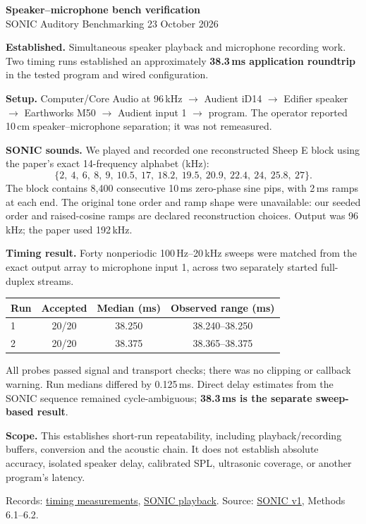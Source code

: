 \documentclass[11pt,letterpaper]{article}
\begin{document}
{\Large\bfseries Speaker--microphone bench verification}\\[-1pt]
{\small SONIC Auditory Benchmarking \hfill 23 October 2026}

\textbf{Established.} Simultaneous speaker playback and microphone recording work.
Two timing runs established an approximately \textbf{38.3\,ms application roundtrip}
in the tested program and wired configuration.

\textbf{Setup.} Computer/Core Audio at 96\,kHz $\to$ Audient iD14 $\to$
Edifier speaker $\to$ Earthworks M50 $\to$ Audient input 1 $\to$ program.
The operator reported 10\,cm speaker--microphone separation; it was not remeasured.

\textbf{SONIC sounds.} We played and recorded one reconstructed Sheep E block using
the paper's exact 14-frequency alphabet (kHz):
\[
\{2,\ 4,\ 6,\ 8,\ 9,\ 10.5,\ 17,\ 18.2,\ 19.5,\ 20.9,\ 22.4,\ 24,\ 25.8,\ 27\}.
\]
The block contains 8,400 consecutive 10\,ms zero-phase sine pips, with 2\,ms
ramps at each end. The original tone order and ramp shape were unavailable:
our seeded order and raised-cosine ramps are declared reconstruction choices.
Output was 96\,kHz; the paper used 192\,kHz.

\textbf{Timing result.} Forty nonperiodic 100\,Hz--20\,kHz sweeps were matched
from the exact output array to microphone input 1, across two separately started
full-duplex streams.
\begin{center}
\begin{tabular}{lccc}
\toprule
Run & Accepted & Median (ms) & Observed range (ms)\\
\midrule
1 & 20/20 & 38.250 & 38.240--38.250\\
2 & 20/20 & 38.375 & 38.365--38.375\\
\bottomrule
\end{tabular}
\end{center}
All probes passed signal and transport checks; there was no clipping or callback
warning. Run medians differed by 0.125\,ms.
Direct delay estimates from the SONIC sequence remained cycle-ambiguous;
\textbf{38.3\,ms is the separate sweep-based result}.

\textbf{Scope.} This establishes short-run repeatability, including playback/recording
buffers, conversion and the acoustic chain. It does not establish absolute accuracy,
isolated speaker delay, calibrated SPL, ultrasonic coverage, or another program's latency.

{\footnotesize
Records:
\href{https://github.com/HowardWHSrun/audiotory_benchmark/blob/main/docs/verification/2026-10-23_Audient_Playback_Microphone_Delay.json}{timing measurements},
\href{https://github.com/HowardWHSrun/audiotory_benchmark/blob/main/docs/verification/2026-10-23_SONIC_E14_Playback.json}{SONIC playback}.
Source: \href{https://www.biorxiv.org/content/10.1101/2025.09.30.679683v1}{SONIC v1}, Methods 6.1--6.2.
}
\end{document}

